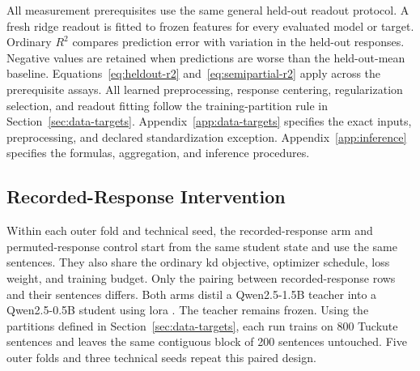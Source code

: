  All measurement prerequisites use the same general held-out readout protocol.
A fresh ridge readout is fitted to frozen features for every evaluated model or target.
Ordinary \(R^2\) compares prediction error with variation in the held-out responses.
Negative values are retained when predictions are worse than the held-out-mean baseline.
Equations~\ref{eq:heldout-r2} and~\ref{eq:semipartial-r2} apply across the prerequisite assays.
All learned preprocessing, response centering, regularization selection, and readout fitting follow the training-partition rule in Section~\ref{sec:data-targets}.
Appendix~\ref{app:data-targets} specifies the exact inputs, preprocessing, and declared standardization exception.
Appendix~\ref{app:inference} specifies the formulas, aggregation, and inference procedures.

\subsection{Recorded-Response Intervention}
\label{sec:recorded-intervention}

Within each outer fold and technical seed, the recorded-response arm and permuted-response control start from the same student state and use the same sentences.
They also share the ordinary \ac{kd} objective, optimizer schedule, loss weight, and training budget.
Only the pairing between recorded-response rows and their sentences differs.
Both arms distil a Qwen2.5-1.5B teacher into a Qwen2.5-0.5B student using \ac{lora} \autocite{hu2022}.
The teacher remains frozen.
Using the partitions defined in Section~\ref{sec:data-targets}, each run trains on 800 Tuckute sentences and leaves the same contiguous block of 200 sentences untouched.
Five outer folds and three technical seeds repeat this paired design.

